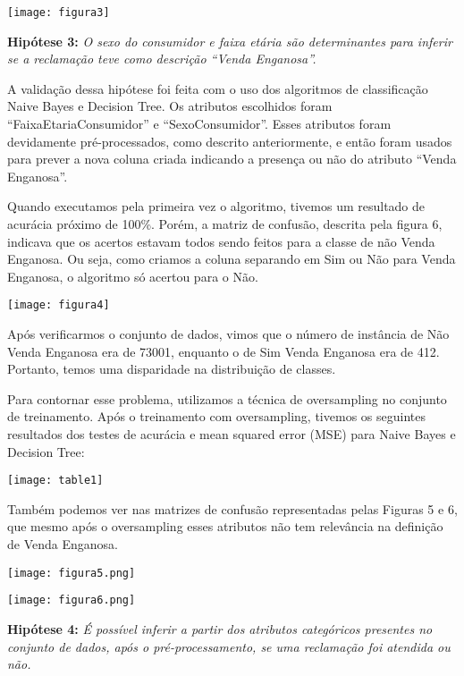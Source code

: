 \documentclass[review]{elsarticle}
\begin{document}
\texttt{[image: figura3]}
\vspace*{5px}

\textbf{Hipótese 3:} \textit{O sexo do consumidor e faixa etária são determinantes para inferir se a reclamação teve como descrição “Venda Enganosa”.}

\vspace*{5px}
	A validação dessa hipótese foi feita com o uso dos algoritmos de classificação Naive Bayes e Decision Tree. Os atributos escolhidos foram “FaixaEtariaConsumidor” e “SexoConsumidor”. Esses atributos foram devidamente pré-processados, como descrito anteriormente, e então foram usados para prever a nova coluna criada indicando a presença ou não do atributo “Venda Enganosa”. 
	
    Quando executamos pela primeira vez o algoritmo, tivemos um resultado de acurácia próximo de 100\%. Porém, a matriz de confusão, descrita pela figura 6, indicava que os acertos estavam todos sendo feitos para a classe de não Venda Enganosa. Ou seja, como criamos a coluna separando em Sim ou Não para Venda Enganosa, o algoritmo só acertou para o Não. 
    
\texttt{[image: figura4]}

Após verificarmos o conjunto de dados, vimos que o número de instância de Não Venda Enganosa era de 73001, enquanto o de Sim Venda Enganosa era de 412. Portanto, temos uma disparidade na distribuição de classes. 

Para contornar esse problema, utilizamos a técnica de oversampling no conjunto de treinamento. Após o treinamento com oversampling, tivemos os seguintes resultados dos testes de acurácia e mean squared error (MSE) para Naive Bayes e Decision Tree:

\texttt{[image: table1]}

Também podemos ver nas matrizes de confusão representadas pelas Figuras 5 e 6, que mesmo após o oversampling esses atributos não tem relevância na definição de Venda Enganosa.

\texttt{[image: figura5.png]}

\texttt{[image: figura6.png]}

\vspace*{5px}

\textbf{Hipótese 4:} \textit{É possível inferir a partir dos atributos categóricos presentes no conjunto de dados, após o pré-processamento, se uma reclamação foi atendida ou não.}

\vspace*{5px}
\end{document}
